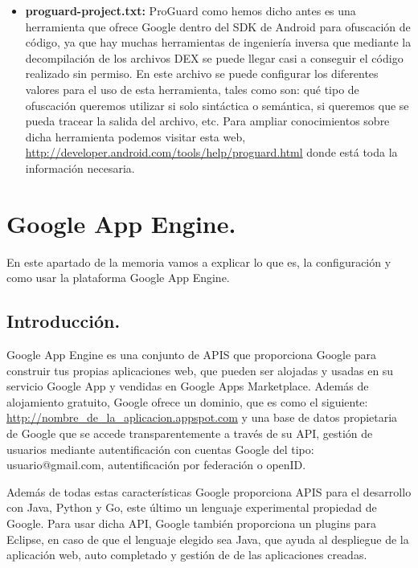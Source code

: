 \begin{itemize}
\item \textbf{proguard-project.txt:} ProGuard como hemos dicho antes es una herramienta que ofrece Google dentro del SDK de Android para ofuscación de código, ya que hay muchas herramientas de ingeniería inversa que mediante la decompilación de los archivos DEX se puede llegar casi a conseguir el código realizado sin permiso. En este archivo se puede configurar los diferentes valores para el uso de esta herramienta, tales como son: qué tipo de ofuscación queremos utilizar si solo sintáctica o semántica, si queremos que se pueda tracear la salida del archivo, etc. Para ampliar conocimientos sobre dicha herramienta podemos visitar esta web, \url{http://developer.android.com/tools/help/proguard.html} donde está toda la información necesaria.

\end{itemize}



\section{Google App Engine.}\label{cap:GAE}
En este apartado de la memoria vamos a explicar lo que es, la configuración y como usar la plataforma Google App Engine.

\subsection{Introducción.}
Google App Engine es una conjunto de APIS que proporciona Google para construir tus propias aplicaciones web, que pueden ser alojadas y usadas en su servicio Google App y vendidas en Google Apps Marketplace. Además de alojamiento gratuito, Google ofrece un dominio, que es como el siguiente: \url{http://nombre\_de\_la\_aplicacion.appspot.com} y una base de datos propietaria de Google que se accede transparentemente a través de su API, gestión de usuarios mediante autentificación con cuentas Google del tipo: usuario@gmail.com, autentificación por federación o openID.

Además de todas estas características Google proporciona APIS para el desarrollo con Java, Python y Go, este último un lenguaje experimental propiedad de Google. Para usar dicha API, Google también proporciona un plugins para Eclipse, en caso de que el lenguaje elegido sea Java, que ayuda al despliegue de la aplicación web, auto completado y gestión de de las aplicaciones creadas. 

